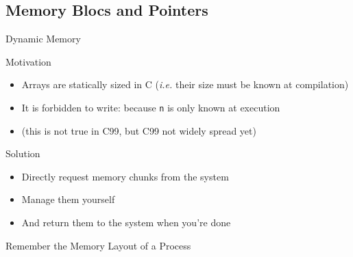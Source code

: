 \subsection{Memory Blocs and Pointers}
\begin{frame}{Dynamic Memory}
  \vspace{-.6\baselineskip}
  \begin{block}{Motivation}
    \begin{itemize}
    \item Arrays are statically sized in C (\textit{i.e.} their size must be
      known at compilation)
    \item It is forbidden to write:
      because \texttt{n} is only known at execution
    \item (this is not true in C99, but C99 not widely spread yet)
    \end{itemize}
  \end{block}\vspace{-.6\baselineskip}

  \begin{block}{Solution}
    \begin{itemize}
    \item Directly request memory chunks from the system
    \item Manage them yourself
    \item And return them to the system when you're done
    \end{itemize}
  \end{block}\vspace{-.6\baselineskip}

  \begin{block}{Remember the Memory Layout of a Process}
    \begin{center}
\end{center}
\end{block}
\end{frame}
